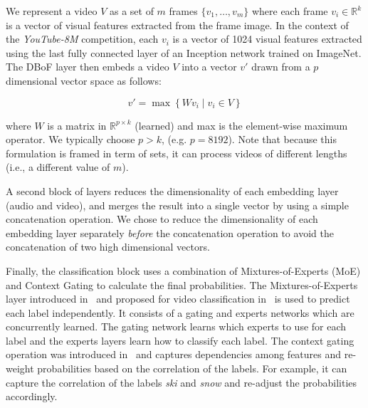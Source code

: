 \documentclass[runningheads]{llncs}
\newcommand{\yt}{\textit{YouTube-8M}\xspace}
\begin{document}
We represent a video $V$ as a set of $m$ frames $\{v_{1},\ldots,v_{m}\}$ where each frame $v_i \in \mathbb R^k$ is a vector of visual features extracted from the frame image.  In the context of the \yt competition, each $v_i$ is a vector of 1024 visual features extracted using the last fully connected layer of an Inception network trained on ImageNet.
The DBoF layer then embeds a video $V$ into a vector $v'$ drawn from a  $p$ dimensional vector space as follows:

\begin{equation*}
	v' = \max\left\{ Wv_{i}\mid v_i \in V \right\}
\end{equation*}

\noindent
where $W$ is a matrix in $\mathbb R^{p \times k}$ (learned) and max is the element-wise maximum operator. We typically choose $p > k$, (e.g. $p = 8192$).
Note that because this formulation is framed in term of sets, it can process videos of different lengths (i.e., a different value of $m$).

A second block of layers reduces the dimensionality of each embedding layer (audio and video), and merges the result into a single vector by using a simple concatenation operation. We chose to reduce the dimensionality of each embedding layer separately {\em before} the concatenation operation to avoid the concatenation of two high dimensional vectors.

Finally, the classification block uses a combination of Mixtures-of-Experts (MoE) and Context Gating to calculate the final probabilities. The Mixtures-of-Experts layer introduced in~\cite{716791} and proposed for video classification in~\cite{45619} is used to predict each label independently. It consists of a gating and experts networks which are concurrently learned. The gating network learns which experts to use for each label and the experts layers learn how to classify each label. The context gating operation was introduced in~\cite{DBLP:journals/corr/MiechLS17} and captures dependencies among features and re-weight probabilities based on the correlation of the labels. For example, it can capture the correlation of the labels {\em ski} and {\em snow} and re-adjust the probabilities accordingly.
\end{document}
